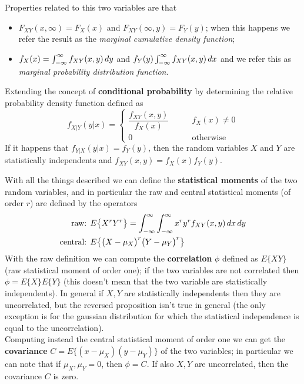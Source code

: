 	Properties related to this two variables are that
	\begin{itemize}
		\item $F_{XY}(x,\infty) = F_X(x)$ and $F_{XY}(\infty,y) = F_Y(y)$; when this happens we refer the result as the \textit{marginal cumulative density function};
		\item $f_X(x) = \int_{-\infty}^\infty f_{XY}(x,y)\, dy$ and $f_Y(y) \int_{-\infty}^\infty f_{XY}(x,y)\, dx$ and we refer this as \textit{marginal probability distribution function}.
	\end{itemize}
	
	Extending the concept of \textbf{conditional probability} by determining the relative probability density function defined as
	\begin{equation}
		f_{X|Y} (y|x) = \begin{cases}
			\dfrac{f_{XY}(x,y)}{f_X(x)} \qquad & f_X(x) \neq 0 \\
			0 & \textrm{otherwise}
		\end{cases}
	\end{equation}
	If it happens that $f_{Y|X}(y|x) = f_Y(y)$, then the random variables $X$ and $Y$ are statistically independents and $f_{XY}(x,y) = f_X(x) f_Y(y)$.
	
	With all the things described we can define the \textbf{statistical moments} of the two random variables, and in particular the raw and central statistical moments (of order $r$) are defined by the operators
	\begin{equation}
	\begin{split}
		\textrm{raw: }& E\big\{X^rY^r\big\}  = \int_{-\infty}^\infty\int_{-\infty}^\infty x^ry^r f_{XY} (x,y)\, dx\, dy \\
		\textrm{central: }& E\big\{\big(X - \mu_X\big)^r\big(Y-\mu_Y\big)^r\big\}
	\end{split}
	\end{equation}
	With the raw definition we can compute the \textbf{correlation} $\phi$ defined as $E\{X Y\}$ (raw statistical moment of order one); if the two variables are not correlated then $\phi = E\{X\} E\{Y\}$ (this doesn't mean that the two variable are statistically independents). In general if $X,Y$ are statistically independents then they are uncorrelated, but the reversed proposition isn't true in general (the only exception is for the gaussian distribution for which the statistical independence is equal to the uncorrelation).\\
	Computing instead the central  statistical moment of order one we can get the \textbf{covariance} $C= E\big\{(x-\mu_X)(y-\mu_Y)\big\}$ of the two variables; in particular we can note that if $\mu_X,\mu_Y= 0$, then $\phi = C$. If also $X,Y$ are uncorrelated, then the covariance $C$ is zero.
	
